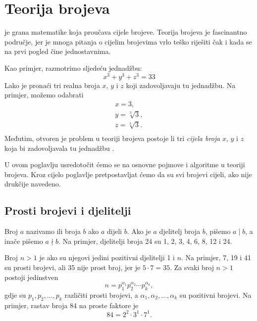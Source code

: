 \chapter{Teorija brojeva}


 je grana matematike
koja proučava cijele brojeve.
Teorija brojeva je fascinantno područje,
jer je mnoga pitanja o cijelim brojevima
vrlo teško riješiti čak i kada se
na prvi pogled čine jednostavnima.

Kao primjer, razmotrimo sljedeću jednadžbu:
\[x^3 + y^3 + z^3 = 33\]
Lako je pronaći tri realna broja $x$, $y$ i $z$
koji zadovoljavaju tu jednadžbu.
Na primjer, možemo odabrati
\[
\begin{array}{lcl}
x = 3, \\
y = \sqrt[3]{3}, \\
z = \sqrt[3]{3}.\\
\end{array}
\]
Međutim, otvoren je problem u teoriji brojeva
postoje li tri
\emph{cijela broja} $x$, $y$ i $z$
koja bi zadovoljavala tu jednadžbu \cite{bec07}.

U ovom poglavlju usredotočit ćemo se na osnovne pojmove
i algoritme u teoriji brojeva.
Kroz cijelo poglavlje pretpostavljat ćemo da su svi brojevi
cijeli, ako nije drukčije navedeno.

\section{Prosti brojevi i djelitelji}


Broj $a$ nazivamo  ili  broja $b$
ako $a$ dijeli $b$.
Ako je $a$ djelitelj broja $b$,
pišemo $a \mid b$, a inače pišemo $a \nmid b$.
Na primjer, djelitelji broja 24 su
1, 2, 3, 4, 6, 8, 12 i 24.


Broj $n>1$ je 
ako su njegovi jedini pozitivni djelitelji 1 i $n$.
Na primjer, 7, 19 i 41 su prosti brojevi,
ali 35 nije prost broj, jer je $5 \cdot 7 = 35$.
Za svaki broj $n>1$ postoji jedinstven
\[ n = p_1^{\alpha_1} p_2^{\alpha_2} \cdots p_k^{\alpha_k},\]
gdje su $p_1,p_2,\ldots,p_k$ različiti prosti brojevi, a
$\alpha_1,\alpha_2,\ldots,\alpha_k$ su pozitivni brojevi.
Na primjer, rastav broja 84 na proste faktore je
\[84 = 2^2 \cdot 3^1 \cdot 7^1.\]

